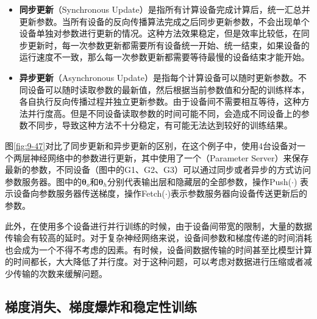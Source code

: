 \begin{itemize}
\vspace{0.5em}
\item {\small\sffamily\bfseries{同步更新}}（Synchronous Update）是指所有计算设备完成计算后，统一汇总并更新参数。当所有设备的反向传播算法完成之后同步更新参数，不会出现单个设备单独对参数进行更新的情况。这种方法效果稳定，但是效率比较低，在同步更新时，每一次参数更新都需要所有设备统一开始、统一结束，如果设备的运行速度不一致，那么每一次参数更新都需要等待最慢的设备结束才能开始。
\vspace{0.5em}
\item {\small\sffamily\bfseries{异步更新}}（Asynchronous Update）是指每个计算设备可以随时更新参数。不同设备可以随时读取参数的最新值，然后根据当前参数值和分配的训练样本，各自执行反向传播过程并独立更新参数。由于设备间不需要相互等待，这种方法并行度高。但是不同设备读取参数的时间可能不同，会造成不同设备上的参数不同步，导致这种方法不十分稳定，有可能无法达到较好的训练结果。
\vspace{0.5em}
\end{itemize}

\parinterval  图\ref{fig:9-47}对比了同步更新和异步更新的区别，在这个例子中，使用4台设备对一个两层神经网络中的参数进行更新，其中使用了一个{\small{}}（Parameter Server）来保存最新的参数，不同设备（图中的G1、G2、G3）可以通过同步或者异步的方式访问参数服务器。图中的$ {\bm \theta}_o $和$ {\bm \theta}_h $分别代表输出层和隐藏层的全部参数，操作Push($\cdot$) 表示设备向参数服务器传送梯度，操作Fetch($\cdot$)表示参数服务器向设备传送更新后的参数。

\parinterval  此外，在使用多个设备进行并行训练的时候，由于设备间带宽的限制，大量的数据传输会有较高的延时。对于复杂神经网络来说，设备间参数和梯度传递的时间消耗也会成为一个不得不考虑的因素。有时候，设备间数据传输的时间甚至比模型计算的时间都长，大大降低了并行度。对于这种问题，可以考虑对数据进行压缩或者减少传输的次数来缓解问题。


\subsection{梯度消失、梯度爆炸和稳定性训练}\label{sec:9.4.4}

